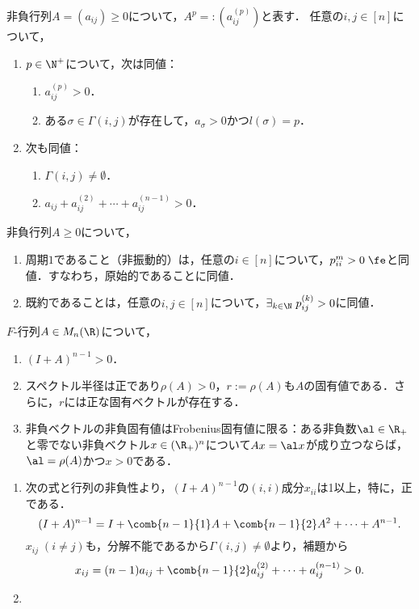 \documentclass[uplatex, dvipdfmx]{jsreport}
\begin{document}
\begin{lemma}
    非負行列$A=(a_{ij})\ge0$について，$A^p=:(a_{ij}^{(p)})$と表す．
    任意の$i,j\in[n]$について，
    \begin{enumerate}
        \item $p\in\N^+$について，次は同値：
        \begin{enumerate}
            \item $a_{ij}^{(p)}>0$．
            \item ある$\sigma\in\Gamma(i,j)$が存在して，$a_{\sigma}>0$かつ$l(\sigma)=p$．
        \end{enumerate}
        \item 次も同値：
        \begin{enumerate}
            \item $\Gamma(i,j)\ne\emptyset$．
            \item $a_{ij}+a_{ij}^{(2)}+\cdots+a_{ij}^{(n-1)}>0$．
        \end{enumerate}
    \end{enumerate}
\end{lemma}
\begin{remarks}
    非負行列$A\ge0$について，
    \begin{enumerate}
        \item 周期$1$であること（非振動的）は，任意の$i\in[n]$について，$p_{ii}^{m}>0\;\fe$と同値．すなわち，原始的であることに同値．
        \item 既約であることは，任意の$i,j\in[n]$について，$\exists_{k\in\N}\;p_{ij}^{(k)}>0$に同値．
    \end{enumerate}
\end{remarks}

\begin{theorem}[Frobenius根の性質]\label{thm-Perron-Frobenius-root}
    $F$-行列$A\in M_n(\R)$について，
    \begin{enumerate}
        \item $(I+A)^{n-1}>0$．
        \item スペクトル半径は正であり$\rho(A)>0$，$r:=\rho(A)$も$A$の固有値である．さらに，$r$には正な固有ベクトルが存在する．
        \item 非負ベクトルの非負固有値はFrobenius固有値に限る：ある非負数$\al\in\R_+$と零でない非負ベクトル$x\in(\R_+)^n$について$Ax=\al x$が成り立つならば，$\al=\rho(A)$かつ$x>0$である．
    \end{enumerate}
\end{theorem}
\begin{Proof}\mbox{}
    \begin{enumerate}
        \item 次の式と行列の非負性より，$(I+A)^{n-1}$の$(i,i)$成分$x_{ii}$は1以上，特に，正である．
        \[(I+A)^{n-1}=I+\comb{n-1}{1}A+\comb{n-1}{2}A^2+\cdots+A^{n-1}.\]
        $x_{ij}\;(i\ne j)$も，分解不能であるから$\Gamma(i,j)\ne\emptyset$より，補題から
        \[x_{ij}=(n-1)a_{ij}+\comb{n-1}{2}a_{ij}^{(2)}+\cdots+a_{ij}^{(n-1)}>0.\]
        \item 
    \end{enumerate}
\end{Proof}
\end{document}
